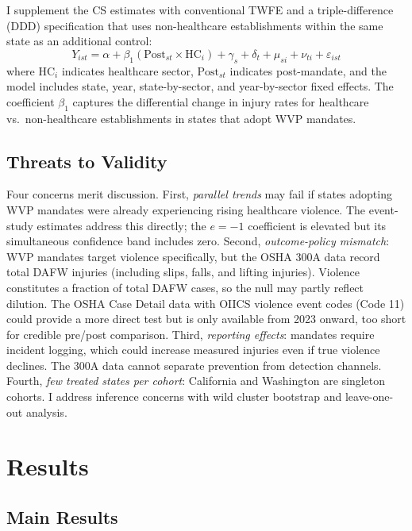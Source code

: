 \documentclass[12pt]{article}
\begin{document}
I supplement the CS estimates with conventional TWFE and a triple-difference (DDD) specification that uses non-healthcare establishments within the same state as an additional control:
\begin{equation}
Y_{ist} = \alpha + \beta_1(\text{Post}_{st} \times \text{HC}_i) + \gamma_s + \delta_t + \mu_{si} + \nu_{ti} + \varepsilon_{ist}
\end{equation}
where $\text{HC}_i$ indicates healthcare sector, $\text{Post}_{st}$ indicates post-mandate, and the model includes state, year, state-by-sector, and year-by-sector fixed effects. The coefficient $\beta_1$ captures the differential change in injury rates for healthcare vs.\ non-healthcare establishments in states that adopt WVP mandates.

\subsection{Threats to Validity}

Four concerns merit discussion. First, \textit{parallel trends} may fail if states adopting WVP mandates were already experiencing rising healthcare violence. The event-study estimates address this directly; the $e=-1$ coefficient is elevated but its simultaneous confidence band includes zero. Second, \textit{outcome-policy mismatch}: WVP mandates target violence specifically, but the OSHA 300A data record total DAFW injuries (including slips, falls, and lifting injuries). Violence constitutes a fraction of total DAFW cases, so the null may partly reflect dilution. The OSHA Case Detail data with OIICS violence event codes (Code 11) could provide a more direct test but is only available from 2023 onward, too short for credible pre/post comparison. Third, \textit{reporting effects}: mandates require incident logging, which could increase measured injuries even if true violence declines. The 300A data cannot separate prevention from detection channels. Fourth, \textit{few treated states per cohort}: California and Washington are singleton cohorts. I address inference concerns with wild cluster bootstrap and leave-one-out analysis.

\section{Results}

\subsection{Main Results}
\end{document}
